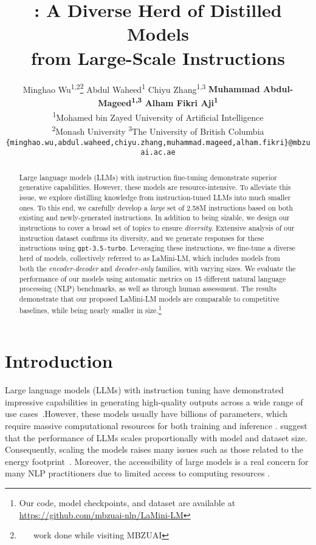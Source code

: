 \documentclass[11pt]{article}
\title{\modelnamefull: A Diverse Herd of Distilled Models \\from Large-Scale Instructions}
\author{
  Minghao Wu\textsuperscript{1,2}\thanks{~ ~ work done while visiting MBZUAI}\: Abdul Waheed\textsuperscript{1}\: Chiyu Zhang\textsuperscript{1,3}\:
  \textbf{Muhammad Abdul-Mageed\textsuperscript{1,3}\: Alham Fikri Aji\textsuperscript{1}} \\
  \textsuperscript{1}Mohamed bin Zayed University of Artificial Intelligence \\
  \textsuperscript{2}Monash University \qquad
  \textsuperscript{3}The University of British Columbia \\
  \texttt{\{minghao.wu,abdul.waheed,chiyu.zhang,muhammad.mageed,alham.fikri\}@mbzuai.ac.ae} 
}
\newcommand{\modelnamefull}{LaMini-LM\xspace}
\newcommand{\llm}[1]{\texttt{#1}\xspace}
\newcommand{\chatgpt}{\llm{gpt-3.5-turbo}}
\begin{document}
\renewcommand{\tableautorefname}{Table}
\renewcommand{\sectionautorefname}{Section}
\renewcommand{\subsectionautorefname}{Section}
\renewcommand{\subsubsectionautorefname}{Section}
\renewcommand{\figureautorefname}{Figure}
\renewcommand{\equationautorefname}{Equation}
\renewcommand{\algorithmautorefname}{Algorithm}
\newcommand{\linenoautorefname}{Line}

\maketitle
\begin{abstract}


Large language models (LLMs) with instruction fine-tuning demonstrate superior generative capabilities. However, these models are resource-intensive. To alleviate this issue, we explore distilling knowledge from instruction-tuned LLMs into much smaller ones. To this end, we carefully develop a \textit{large} set of 2.58M instructions based on both existing and newly-generated instructions. In addition to being sizable, we design our instructions to cover a broad set of topics to ensure \textit{diversity}. Extensive analysis of our instruction dataset confirms its diversity, and we generate responses for these instructions using \chatgpt. 
Leveraging these instructions, we fine-tune a diverse herd of models, collectively referred to as \modelnamefull, which includes models from both the \textit{encoder-decoder} and \textit{decoder-only} families, with varying sizes.
We evaluate the performance of our models using automatic metrics on 15 different natural language processing (NLP) benchmarks, as well as through human assessment.
The results demonstrate that our proposed \modelnamefull models are comparable to competitive baselines, while being nearly  smaller in size.\footnote{Our code, model checkpoints, and dataset are available at \url{https://github.com/mbzuai-nlp/LaMini-LM}}
\end{abstract}


\section{Introduction}

Large language models (LLMs) with instruction tuning have demonstrated impressive capabilities in generating high-quality outputs across a wide range of use cases~\cite{ouyang2022training, wei2022finetuned, DBLP:conf/iclr/SanhWRBSACSRDBX22, DBLP:journals/corr/abs-2210-11416, DBLP:journals/corr/abs-2303-08774}.However, these models usually have billions of parameters, which require massive computational resources for both training and inference \cite{NEURIPS2020_1457c0d6, DBLP:journals/corr/abs-2201-08239, DBLP:journals/corr/abs-2203-15556, DBLP:journals/corr/abs-2204-02311}. \citet{kaplan2020scaling} suggest that the performance of LLMs scales proportionally with model and dataset size. Consequently, scaling the models raises many issues such as those related to the energy footprint~\cite{strubell-etal-2019-energy}. Moreover, the accessibility of large models is a real concern for many NLP practitioners due to limited access to computing resources \cite{DBLP:journals/corr/abs-2012-08958}.
\end{document}
